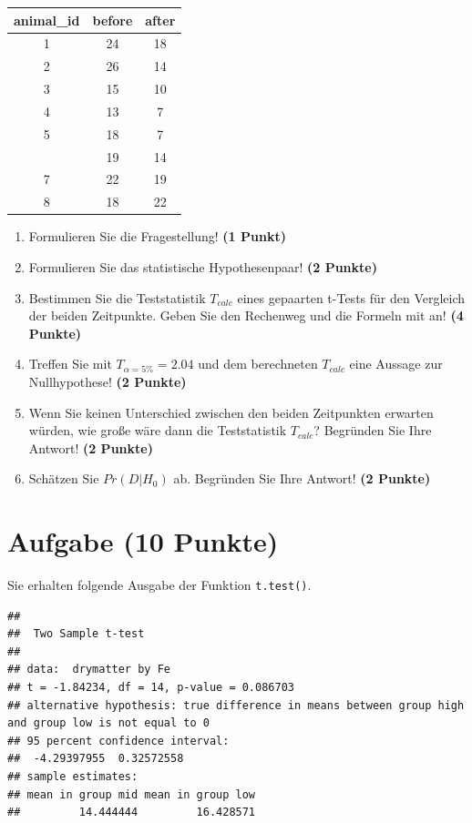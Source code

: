 \documentclass[a4paper, 10pt]{scrartcl}\usepackage[]{graphicx}\usepackage[]{color}
\makeatletter
\newenvironment{kframe}{%
 \def\at@end@of@kframe{}%
 \ifinner\ifhmode%
  \def\at@end@of@kframe{\end{minipage}}%
  \begin{minipage}{\columnwidth}%
 \fi\fi%
 \def\FrameCommand##1{\hskip\@totalleftmargin \hskip-\fboxsep
 \colorbox{shadecolor}{##1}\hskip-\fboxsep
     \hskip-\linewidth \hskip-\@totalleftmargin \hskip\columnwidth}%
 \MakeFramed {\advance\hsize-\width
   \@totalleftmargin\z@ \linewidth\hsize
   \@setminipage}}%
 {\par\unskip\endMakeFramed%
 \at@end@of@kframe}
\newenvironment{knitrout}{}{} %
\makeatother
\begin{document}
\begin{table}[!h]
\centering
\begin{tabular}{ccc}
\toprule
animal\_id & before & after\\
\midrule
1 & 24 & 18\\
2 & 26 & 14\\
3 & 15 & 10\\
4 & 13 & 7\\
5 & 18 & 7\\
\addlinespace
6 & 19 & 14\\
7 & 22 & 19\\
8 & 18 & 22\\
\bottomrule
\end{tabular}
\end{table}



\begin{enumerate}
\item Formulieren Sie die Fragestellung! \textbf{(1 Punkt)}
\item Formulieren Sie das statistische Hypothesenpaar! \textbf{(2
    Punkte)}
\item Bestimmen Sie die Teststatistik $T_{calc}$ eines gepaarten t-Tests f{\"u}r den
  Vergleich der beiden Zeitpunkte. Geben Sie den Rechenweg und die Formeln
  mit an! \textbf{(4 Punkte)}
\item Treffen Sie mit $T_{\alpha = 5\%} = 2.04$ und dem berechneten $T_{calc}$ eine Aussage
  zur Nullhypothese! \textbf{(2 Punkte)}
\item Wenn Sie keinen Unterschied zwischen den beiden Zeitpunkten erwarten
  w{\"u}rden, wie gro{\ss}e w{\"a}re dann die Teststatistik $T_{calc}$? Begr{\"u}nden Sie Ihre
  Antwort! \textbf{(2 Punkte)}
\item Sch{\"a}tzen Sie $Pr(D|H_0)$ ab. Begr{\"u}nden Sie Ihre Antwort! \textbf{(2
    Punkte)}
\end{enumerate} 
\clearpage

\section{Aufgabe \hfill (10 Punkte)}

Sie erhalten folgende \Rlogo Ausgabe der Funktion \texttt{t.test()}.

\begin{knitrout}
\color{fgcolor}\begin{kframe}
\begin{verbatim}
## 
## 	Two Sample t-test
## 
## data:  drymatter by Fe
## t = -1.84234, df = 14, p-value = 0.086703
## alternative hypothesis: true difference in means between group high and group low is not equal to 0
## 95 percent confidence interval:
##  -4.29397955  0.32572558
## sample estimates:
## mean in group mid mean in group low 
##         14.444444         16.428571
\end{verbatim}
\end{kframe}
\end{knitrout}
\end{document}
